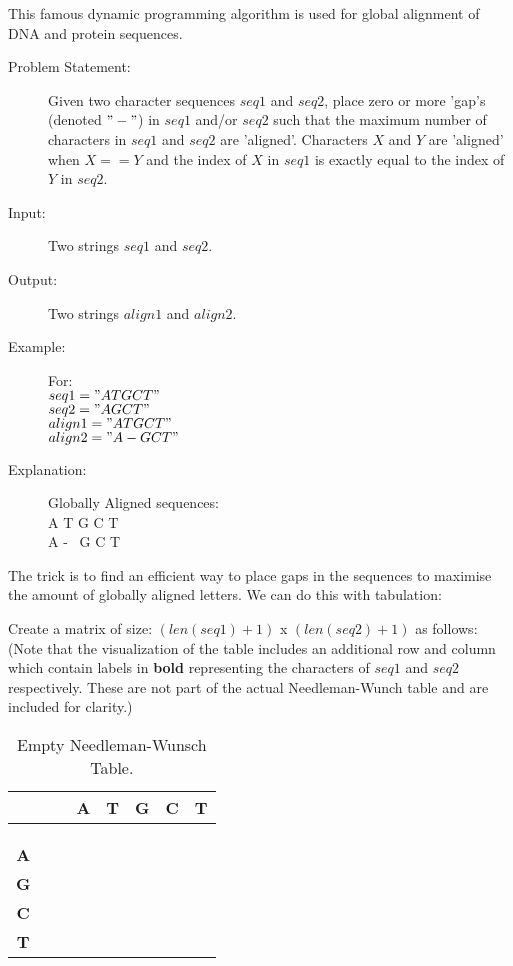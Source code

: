 This famous dynamic programming algorithm is used for global alignment of DNA and protein sequences.

\begin{description}
    
    \item[Problem Statement:]
        Given two character sequences $seq1$ and $seq2$,
        place zero or more 'gap's (denoted $"-"$) in $seq1$ and/or $seq2$ such that the maximum number of characters in $seq1$ and $seq2$ are 'aligned'.
        Characters $X$ and $Y$ are 'aligned' when $X == Y$ and the index of $X$ in $seq1$ is exactly equal to the index of $Y$ in $seq2$.
        
    \item[Input:] 
        Two strings $seq1$ and $seq2$.
        
    \item[Output:]
        Two strings $align1$ and $align2$.
        
    \item[Example:] For:\\
        $seq1 = "ATGCT"$\\
        $seq2 = "AGCT"$\\
        $align1 = "ATGCT"$\\
        $align2 = "A-GCT"$

    \item[Explanation:]
        Globally Aligned sequences:\\
        A T G C T\\
        A - \ G C T
\end{description}

The trick is to find an efficient way to place gaps in the sequences to maximise the amount of globally aligned letters.
We can do this with tabulation:
\newpage

Create a matrix of size: $(len(seq1) + 1)$ x $(len(seq2) + 1)$ as follows:
(Note that the visualization of the table includes an additional row and column which contain labels in \textbf{bold} representing the characters of $seq1$ and $seq2$ respectively. These are not part of the actual Needleman-Wunch table and are included for clarity.)

\begin{table}[H]
    \centering
    \begin{tabular}{|c|c|c|c|c|c|c|}
        \hline
          & $\phantom{\textbf{A}}$ & \textbf{A} & \textbf{T} & \textbf{G} & \textbf{C} & \textbf{T} \\
        \hline
         & $\phantom{0}$ &  &  &  &  &  \\
        \hline
        \textbf{A} &  &  &  &  &  &  \\
        \hline
        \textbf{G} &  &  &  &  &  &  \\
        \hline
        \textbf{C} &  &  &  &  &  &  \\
        \hline
        \textbf{T} &  &  &  &  &  &  \\
        \hline
    \end{tabular}
    \caption{Empty Needleman-Wunsch Table.}
\end{table}


